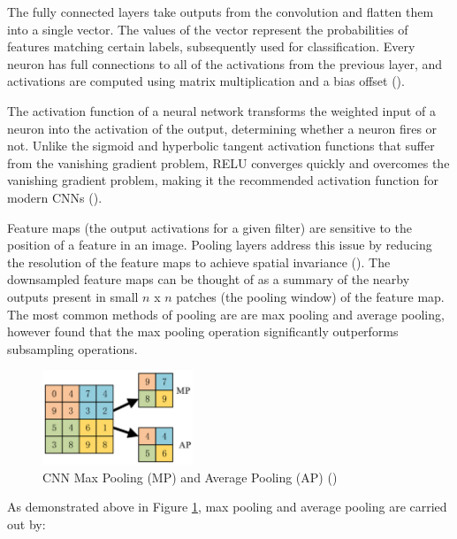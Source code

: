 The fully connected layers take outputs from the convolution and flatten them into a single vector. The values of the vector represent the probabilities of features matching certain labels, subsequently used for classification. Every neuron has full connections to all of the activations from the previous layer, and activations are computed using matrix multiplication and a bias offset (\cite{stanford_cs231n_2019}).

The activation function of a neural network transforms the weighted input of a neuron into the activation of the output, determining whether a neuron fires or not. Unlike the sigmoid and hyperbolic tangent activation functions that suffer from the vanishing gradient problem, \acrfull{RELU} converges quickly and overcomes the vanishing gradient problem, making it the recommended activation function for modern \acrshort{CNN}s (\cite{nair_rectified_2010}).

Feature maps (the output activations for a given filter) are sensitive to the position of a feature in an image. Pooling layers address this issue by reducing the resolution of the feature maps to achieve spatial invariance (\cite{scherer_evaluation_2010}). The downsampled feature maps can be thought of as a summary of the nearby outputs present in small $n$ x $n$ patches (the pooling window) of the feature map. The most common methods of pooling are are max pooling and average pooling, however \cite{scherer_evaluation_2010} found that the max pooling operation significantly outperforms subsampling operations.

\begin{figure}[ht!]
\centering
\includegraphics[width=0.4\textwidth]{media/literature/machine_learning/ml_pooling.png}
\caption[Diagram of CNN Max Pooling and Average Pooling ]{\acrshort{CNN} Max Pooling (MP) and Average Pooling (AP) (\cite{wang_pooling_2018})}
\label{fig:cnn_pooling}
\end{figure}

As demonstrated above in Figure \ref{fig:cnn_pooling}, max pooling and average pooling are carried out by:

